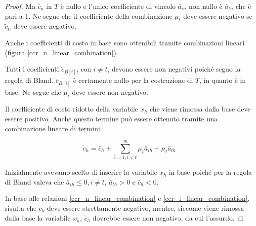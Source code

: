 \documentclass[\main/main.tex]{subfiles}
\begin{document}
\begin{proof}
  Ma $\bar{c}_n$ in $T$ è nullo e l'unico coefficiente di vincolo $\bar{a}_{in}$ non nullo è $\bar{a}_{tn}$ che è pari a $1$. Ne segue che il coefficiente della combinazione $\mu_t$ deve essere negativo se $\tilde{c}_n$ deve essere negativo.

  Anche i coefficienti di costo in base sono ottenibili tramite combinazioni lineari (figura \ref{ccr_n_linear_combination}).

  Tutti i coefficienti $\tilde{c}_{B[i]}$, con $i \neq t$, devono essere non negativi poiché seguo la regola di Bland. $\bar{c}_{B[i]}$ è certamente nullo per la costruzione di $T$, in quanto è in base. Ne segue che $\mu_i$ deve essere non negativo.

  Il coefficiente di costo ridotto della variabile $x_h$ che viene rimossa dalla base deve essere positivo. Anche questo termine può essere ottenuto tramite una combinazione lineare di termini:

  \[
    \tilde{c}_h = \bar{c}_h + \sum_{i=1, i \neq t}^m \mu_i \bar{a}_{ih} + \mu_t\bar{a}_{th}
  \]

  Inizialmente avevamo scelto di inserire la variabile $x_h$ in base poiché per la regola di Bland valeva che $\bar{a}_{ih} \leq 0, i \neq t$, $\bar{a}_{th} > 0$ e $\bar{c}_h<0$.

  In base alle relazioni \ref{ccr_n_linear_combination} e \ref{ccr_i_linear_combination}, risulta che $\tilde{c}_h$ deve essere strettamente negativo, mentre, siccome viene rimossa dalla base la variabile $x_h$, $\tilde{c}_h$ dovrebbe essere non negativo, da cui l'assurdo.
\end{proof}
\end{document}
